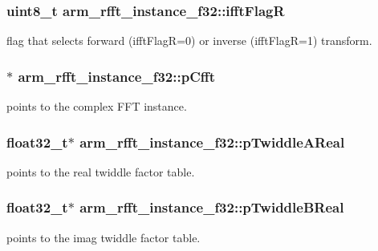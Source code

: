 \subsubsection[{\texorpdfstring{ifft\+FlagR}{ifftFlagR}}]{\setlength{\rightskip}{0pt plus 5cm}uint8\+\_\+t arm\+\_\+rfft\+\_\+instance\+\_\+f32\+::ifft\+FlagR}\hypertarget{structarm__rfft__instance__f32_a5ee6d10a934ab4b666e0bb286c3d633f}{}\label{structarm__rfft__instance__f32_a5ee6d10a934ab4b666e0bb286c3d633f}
flag that selects forward (ifft\+FlagR=0) or inverse (ifft\+FlagR=1) transform. 
\subsubsection[{\texorpdfstring{p\+Cfft}{pCfft}}]{$\ast$ arm\+\_\+rfft\+\_\+instance\+\_\+f32\+::p\+Cfft}\hypertarget{structarm__rfft__instance__f32_a9f47ba9f50c81e4445ae3827b981bc05}{}\label{structarm__rfft__instance__f32_a9f47ba9f50c81e4445ae3827b981bc05}
points to the complex F\+FT instance. 
\subsubsection[{\texorpdfstring{p\+Twiddle\+A\+Real}{pTwiddleAReal}}]{\setlength{\rightskip}{0pt plus 5cm}float32\+\_\+t$\ast$ arm\+\_\+rfft\+\_\+instance\+\_\+f32\+::p\+Twiddle\+A\+Real}\hypertarget{structarm__rfft__instance__f32_a534cc7e6e9b3e3dd022fad611c762142}{}\label{structarm__rfft__instance__f32_a534cc7e6e9b3e3dd022fad611c762142}
points to the real twiddle factor table. 
\subsubsection[{\texorpdfstring{p\+Twiddle\+B\+Real}{pTwiddleBReal}}]{\setlength{\rightskip}{0pt plus 5cm}float32\+\_\+t$\ast$ arm\+\_\+rfft\+\_\+instance\+\_\+f32\+::p\+Twiddle\+B\+Real}\hypertarget{structarm__rfft__instance__f32_a23543ecfd027fea2477fe1eea23c3c4d}{}\label{structarm__rfft__instance__f32_a23543ecfd027fea2477fe1eea23c3c4d}
points to the imag twiddle factor table. 
